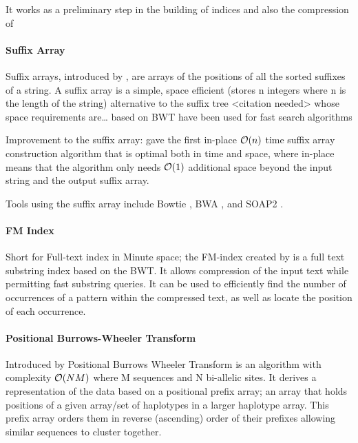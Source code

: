 \documentclass[10pt, a4paper]{article}
\begin{document}
It works as a preliminary step in the building of indices and also the
compression of 

\paragraph{Suffix Array}
\label{sec:org238fc67}
Suffix arrays, introduced by \cite{manberSuffixArraysNew1990}, are arrays of the
positions of all the sorted suffixes of a string.
A suffix array is a simple, space efficient
(stores n integers where n is the length of the string) alternative to the
suffix tree <citation needed> whose space requirements are\ldots{}
based on BWT have been used for fast search algorithms

Improvement to the suffix array: \cite{liMinimapMiniasmFast2016}
gave the first in-place \(\mathcal{O}(n)\) time suffix array construction algorithm that
is optimal both in time and space, where in-place means that the algorithm only
needs \(\mathcal{O}(1)\) additional space beyond the input string and the output suffix
array.

Tools using the suffix array include Bowtie
\cite{langmeadUltrafastMemoryefficientAlignment2009}, BWA
\cite{liFastAccurateShort2009},
and SOAP2 \cite{liSOAP2ImprovedUltrafast2009}.

\paragraph{FM Index}
\label{sec:org48d8360}
Short for Full-text index in Minute space; the FM-index created
by \cite{ferraginaOpportunisticDataStructures2000} is a full text substring index
based on the BWT. It allows compression of the input text while permitting fast
substring queries. It can be used to efficiently find the number of occurrences
of a pattern within the compressed text, as well as locate the position of each
occurrence.

\paragraph{Positional Burrows-Wheeler Transform}
\label{sec:org335e21d}
Introduced by \cite{durbinEfficientHaplotypeMatching2014} Positional Burrows
Wheeler Transform is an algorithm with complexity \(\mathcal{O}(NM)\) where M sequences
and N bi-allelic sites.
It derives a representation of the data based on a positional prefix array; an
array that holds positions of a given array/set of haplotypes in a larger
haplotype array. This prefix array orders them in reverse (ascending) order of
their prefixes allowing similar sequences to cluster together.
\end{document}
